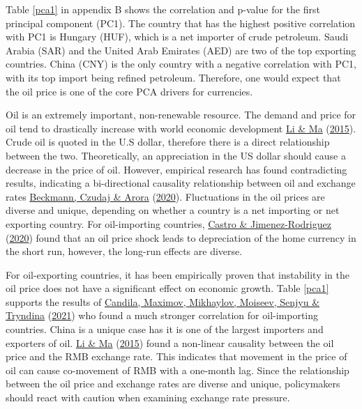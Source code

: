 \documentclass[11pt,preprint, authoryear]{elsarticle}
\numberwithin{equation}{section}
\numberwithin{figure}{section}
\numberwithin{table}{section}
\begin{document}
Table \ref{pca1} in appendix B shows the correlation and p-value for the
first principal component (PC1). The country that has the highest
positive correlation with PC1 is Hungary (HUF), which is a net importer
of crude petroleum. Saudi Arabia (SAR) and the United Arab Emirates
(AED) are two of the top exporting countries. China (CNY) is the only
country with a negative correlation with PC1, with its top import being
refined petroleum. Therefore, one would expect that the oil price is one
of the core PCA drivers for currencies.

Oil is an extremely important, non-renewable resource. The demand and
price for oil tend to drastically increase with world economic
development \protect\hyperlink{ref-li2015}{Li \& Ma}
(\protect\hyperlink{ref-li2015}{2015}). Crude oil is quoted in the U.S
dollar, therefore there is a direct relationship between the two.
Theoretically, an appreciation in the US dollar should cause a decrease
in the price of oil. However, empirical research has found contradicting
results, indicating a bi-directional causality relationship between oil
and exchange rates \protect\hyperlink{ref-beck2020}{Beckmann, Czudaj \&
Arora} (\protect\hyperlink{ref-beck2020}{2020}). Fluctuations in the oil
prices are diverse and unique, depending on whether a country is a net
importing or net exporting country. For oil-importing countries,
\protect\hyperlink{ref-castro}{Castro \& Jimenez-Rodriguez}
(\protect\hyperlink{ref-castro}{2020}) found that an oil price shock
leads to depreciation of the home currency in the short run, however,
the long-run effects are diverse.

For oil-exporting countries, it has been empirically proven that
instability in the oil price does not have a significant effect on
economic growth. Table \ref{pca1} supports the results of
\protect\hyperlink{ref-can2021}{Candila, Maximov, Mikhaylov, Moiseev,
Senjyu \& Tryndina} (\protect\hyperlink{ref-can2021}{2021}) who found a
much stronger correlation for oil-importing countries. China is a unique
case has it is one of the largest importers and exporters of oil.
\protect\hyperlink{ref-li2015}{Li \& Ma}
(\protect\hyperlink{ref-li2015}{2015}) found a non-linear causality
between the oil price and the RMB exchange rate. This indicates that
movement in the price of oil can cause co-movement of RMB with a
one-month lag. Since the relationship between the oil price and exchange
rates are diverse and unique, policymakers should react with caution
when examining exchange rate pressure.
\end{document}
